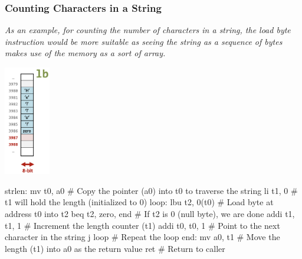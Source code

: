 \subsubsection{Counting Characters in a String}
\textit{As an example, for counting the number of characters in a string, the load byte instruction would be more suitable as seeing the string as a sequence of bytes makes use of the memory as a sort of array.} \\ \vspace*{5px}

\begin{center}
    \includegraphics[width=0.15\textwidth]{chapters/chapter1c/images/hello2.png}
\end{center}
\begin{center}
    \begin{assembly}
strlen:
    mv t0, a0 # Copy the pointer (a0) into t0 to traverse the string
    li t1, 0 # t1 will hold the length (initialized to 0)
loop:
    lbu t2, 0(t0) # Load byte at address t0 into t2
    beq t2, zero, end # If t2 is 0 (null byte), we are done
    addi t1, t1, 1 # Increment the length counter (t1)
    addi t0, t0, 1 # Point to the next character in the string
j loop # Repeat the loop
end:
    mv a0, t1 # Move the length (t1) into a0 as the return value
    ret # Return to caller
    \end{assembly}
\end{center}

